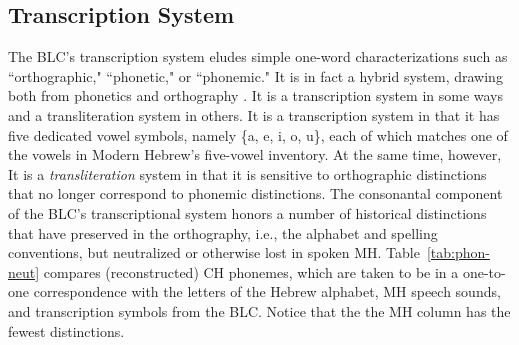 \subsection{Transcription System}\label{sec:transcription}
The \ac{BLC}'s transcription system eludes simple one-word characterizations 
such as ``orthographic,"
``phonetic," or ``phonemic." It is in fact a hybrid system, drawing
both from phonetics and orthography \citep{albert-et-al:2013}. It is a transcription system
in some ways and a transliteration system in others.
It is a transcription system in that it has five dedicated vowel symbols, 
namely \{a, e, i, o, u\}, each of which matches one of the vowels in Modern 
Hebrew's five-vowel inventory. %
At the same time, however, 
It is a \emph{transliteration} system in that it is sensitive to orthographic distinctions that no longer correspond
to phonemic distinctions. The consonantal component of the \ac{BLC}'s transcriptional system 
honors a number of historical distinctions that have preserved in the orthography, i.e., the alphabet and 
spelling conventions, but neutralized or otherwise lost in spoken \ac{MH}. Table~\ref{tab:phon-neut} compares 
(reconstructed) \ac{CH} phonemes, which are taken to be in a one-to-one correspondence with the letters of 
the Hebrew alphabet, \ac{MH} speech sounds, and transcription symbols from the \ac{BLC}. Notice that the
the \ac{MH} column has the fewest distinctions.





